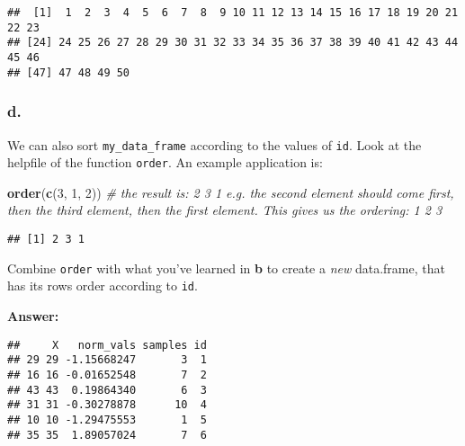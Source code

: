 \documentclass[]{article}
\newenvironment{Shaded}{\begin{snugshade}}{\end{snugshade}}
\newcommand{\CommentTok}[1]{\textcolor[rgb]{0.56,0.35,0.01}{\textit{#1}}}
\newcommand{\DecValTok}[1]{\textcolor[rgb]{0.00,0.00,0.81}{#1}}
\newcommand{\KeywordTok}[1]{\textcolor[rgb]{0.13,0.29,0.53}{\textbf{#1}}}
\newcommand{\NormalTok}[1]{#1}
\newcommand{\OperatorTok}[1]{\textcolor[rgb]{0.81,0.36,0.00}{\textbf{#1}}}
\newcommand{\StringTok}[1]{\textcolor[rgb]{0.31,0.60,0.02}{#1}}
\begin{document}
\begin{verbatim}
##  [1]  1  2  3  4  5  6  7  8  9 10 11 12 13 14 15 16 17 18 19 20 21 22 23
## [24] 24 25 26 27 28 29 30 31 32 33 34 35 36 37 38 39 40 41 42 43 44 45 46
## [47] 47 48 49 50
\end{verbatim}

\hypertarget{d.-6}{%
\subsubsection{d.}\label{d.-6}}

We can also sort \texttt{my\_data\_frame} according to the values of
\texttt{id}. Look at the helpfile of the function \texttt{order}. An
example application is:

\begin{Shaded}
\begin{Highlighting}[]
\KeywordTok{order}\NormalTok{(}\KeywordTok{c}\NormalTok{(}\DecValTok{3}\NormalTok{, }\DecValTok{1}\NormalTok{, }\DecValTok{2}\NormalTok{)) }\CommentTok{# the result is: 2 3 1 e.g. the second element should come first, then the third element, then the first element. This gives us the ordering: 1 2 3}
\end{Highlighting}
\end{Shaded}

\begin{verbatim}
## [1] 2 3 1
\end{verbatim}

Combine \texttt{order} with what you've learned in \textbf{b} to create
a \emph{new} data.frame, that has its rows order according to
\texttt{id}.

\textbf{Answer:}

\begin{Shaded}
\end{Shaded}

\begin{verbatim}
##     X   norm_vals samples id
## 29 29 -1.15668247       3  1
## 16 16 -0.01652548       7  2
## 43 43  0.19864340       6  3
## 31 31 -0.30278878      10  4
## 10 10 -1.29475553       1  5
## 35 35  1.89057024       7  6
\end{verbatim}
\end{document}
